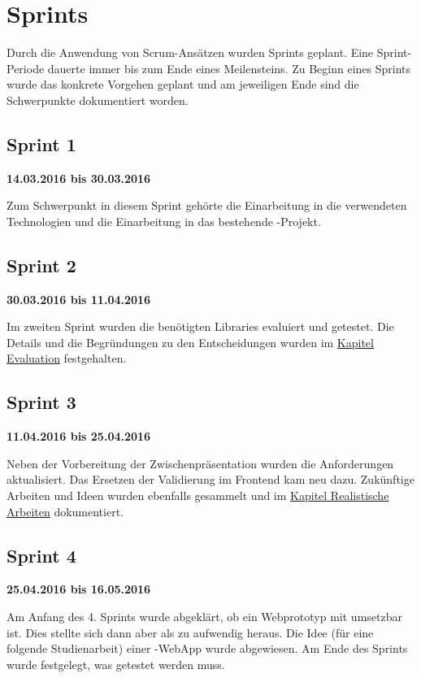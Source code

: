 \section{Sprints}
Durch die Anwendung von Scrum-Ansätzen wurden Sprints geplant. 
Eine Sprint-Periode dauerte immer bis zum Ende eines Meilensteins. 
Zu Beginn eines Sprints wurde das konkrete Vorgehen geplant und am jeweiligen Ende sind die Schwerpunkte dokumentiert worden.


\subsection{Sprint 1}
\textbf{14.03.2016 bis 30.03.2016}

Zum Schwerpunkt in diesem Sprint gehörte die Einarbeitung in die verwendeten Technologien und die Einarbeitung in das bestehende \kort{}-Projekt.

\subsection{Sprint 2}
\textbf{30.03.2016 bis 11.04.2016}

Im zweiten Sprint wurden die benötigten Libraries evaluiert und getestet.
Die Details und die Begründungen zu den Entscheidungen wurden im \hyperref[tb-evaluation]{Kapitel Evaluation} festgehalten.

\subsection{Sprint 3}
\textbf{11.04.2016 bis 25.04.2016}

Neben der Vorbereitung der Zwischenpräsentation wurden die Anforderungen aktualisiert. 
Das Ersetzen der Validierung im Frontend kam neu dazu. 
Zukünftige Arbeiten und Ideen wurden ebenfalls gesammelt und im \hyperref[pd-weiterentwicklung-realistisch]{Kapitel Realistische Arbeiten} dokumentiert.

\subsection{Sprint 4}
\textbf{25.04.2016 bis 16.05.2016}

Am Anfang des 4. Sprints wurde abgeklärt, ob ein Webprototyp mit  umsetzbar ist. 
Dies stellte sich dann aber als zu aufwendig heraus. 
Die Idee (für eine folgende Studienarbeit) einer -\gls{WebApp} wurde abgewiesen.
Am Ende des Sprints wurde festgelegt, was getestet werden muss.

